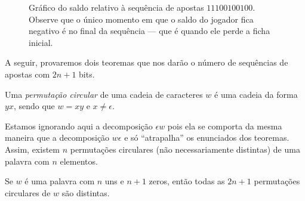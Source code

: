 \begin{figure}[h]
    \centering
    \caption{
        Gráfico do saldo relativo à sequência de apostas $11100100100$.
        Observe que o único momento em que o saldo do jogador fica negativo
        é no final da sequência
        --- que é quando ele perde a ficha inicial.
    }
    \label{fig:apostas}
\end{figure}

A seguir,
provaremos dois teoremas
que nos darão o número de sequências de apostas com $2n+1$ bits.

\begin{definition}
    Uma \emph{permutação circular}
    de uma cadeia de caracteres $w$
    é uma cadeia da forma $yx$,
    sendo que $w = xy$ e $x \neq \epsilon$.
\end{definition}

Estamos ignorando aqui a decomposição $\epsilon w$
pois ela se comporta da mesma maneira que a decomposição $w \epsilon$
e só ``atrapalha'' os enunciados dos teoremas.
Assim,
existem $n$ permutações circulares (não necessariamente distintas)
de uma palavra com $n$ elementos.

\begin{lemma}
    Se $w$ é uma palavra com $n$ uns e $n+1$ zeros,
    então todas as $2n+1$ permutações circulares de $w$ são distintas.
\end{lemma}

